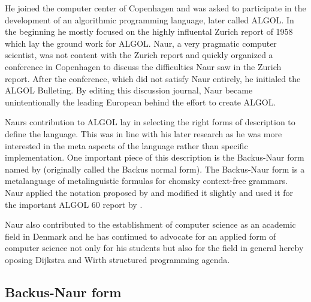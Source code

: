 \documentclass{article}
\begin{document}
He joined the computer center of Copenhagen and was asked to participate in the development of an algorithmic programming language, later called ALGOL. In the beginning he mostly focused on the highly influental Zurich report of 1958 which lay the ground work for ALGOL. Naur, a very pragmatic computer scientist, was not content with the Zurich report and quickly organized a conference in Copenhagen to discuss the difficulties Naur saw in the Zurich report. After the conference, which did not satisfy Naur entirely, he initialed the ALGOL Bulleting. By editing this discussion journal, Naur became unintentionally the leading European behind the effort to create ALGOL. 

Naurs contribution to ALGOL lay in selecting the right forms of description to define the language. This was in line with his later research as he was more interested in the meta aspects of the language rather than specific implementation. One important piece of this description is the Backus-Naur form named by \cite{knuth-ba} (originally called the Backus normal form). The Backus-Naur form is a metalanguage of metalinguistic formulas for chomsky context-free grammars. Naur applied the notation proposed by \cite{Backus1959TheSA} and modified it slightly and used it for the important ALGOL 60 report by \cite{10.1093/comjnl/5.4.349}.

Naur also contributed to the establishment of computer science as an academic field in Denmark and he has continued to advocate for an applied form of computer science not only for his students but also for the field in general hereby oposing Dijkstra and Wirth structured programming agenda.

\subsection{Backus-Naur form}



\end{document}
